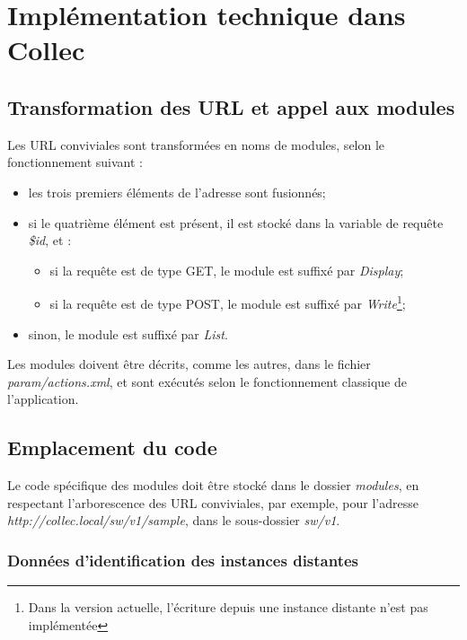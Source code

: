 \chapter{Implémentation technique dans Collec}

\section{Transformation des URL et appel aux modules}
Les URL conviviales sont transformées en noms de modules, selon le fonctionnement suivant :
\begin{itemize}
\item les trois premiers éléments de l'adresse sont fusionnés;
\item si le quatrième élément est présent, il est stocké dans la variable de requête \textit{\$id}, et :
\begin{itemize}
\item si la requête est de type GET, le module est suffixé par \textit{Display};
\item si la requête est de type POST, le module est suffixé par \textit{Write}\footnote{Dans la version actuelle, l'écriture depuis une instance distante n'est pas implémentée};
\end{itemize}
\item sinon, le module est suffixé par \textit{List}.
\end{itemize}

Les modules doivent être décrits, comme les autres, dans le fichier \textit{param/actions.xml}, et sont exécutés selon le fonctionnement classique de l'application.

\section{Emplacement du code}
Le code spécifique des modules doit être stocké dans le dossier \textit{modules}, en respectant l'arborescence des URL conviviales, par exemple, pour l'adresse \textit{http://collec.local/sw/v1/sample}, dans le sous-dossier \textit{sw/v1}.


\subsection{Données d'identification des instances distantes}
\label{table_instance}

